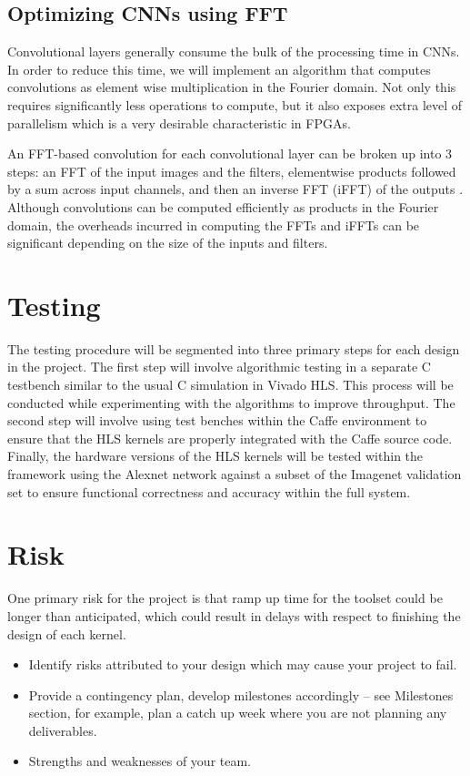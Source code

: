 \documentclass[conference,compsoc]{IEEEtran/IEEEtran}
\begin{document}
\subsection{Optimizing CNNs using FFT}
Convolutional layers generally consume the bulk of the processing time in CNNs. In order to reduce this time, we will implement an algorithm that computes convolutions as element wise multiplication in the Fourier domain. Not only this requires significantly less operations to compute, but it also exposes extra level of parallelism which is a very desirable characteristic in FPGAs.  

An FFT-based convolution for each convolutional layer can be broken up into $3$ steps: an FFT of the input images and the filters, elementwise products followed by a sum across input channels, and then an inverse FFT (iFFT) of the outputs \cite{FFT1}. Although convolutions can be computed efficiently as products in the Fourier domain, the overheads incurred in computing the FFTs and iFFTs can be significant depending on the size of the inputs and filters. 


\section{Testing}
The testing procedure will be segmented into three primary steps for each design in the project. 
The first step will involve algorithmic testing in a separate C testbench similar to the usual C 
simulation in Vivado HLS. This process will be conducted while experimenting with the algorithms 
to improve throughput. The second step will involve using test benches within the Caffe environment 
to ensure that the HLS kernels are properly integrated with the Caffe source code. Finally, the 
hardware versions of the HLS kernels will be tested within the framework using the Alexnet network 
against a subset of the Imagenet validation set to ensure functional correctness and accuracy 
within the full system. 

\section{Risk}

One primary risk for the project is that ramp up time for the toolset could be longer than 
anticipated, which could result in delays with respect to finishing the design of each kernel. 

\begin{itemize}
\item Identify risks attributed to your design which may cause your project to fail.
\item Provide a contingency plan, develop milestones accordingly -- see Milestones section, for example, plan a catch up week where you are not planning any deliverables.
\item Strengths and weaknesses of your team.
\end{itemize}
\end{document}
